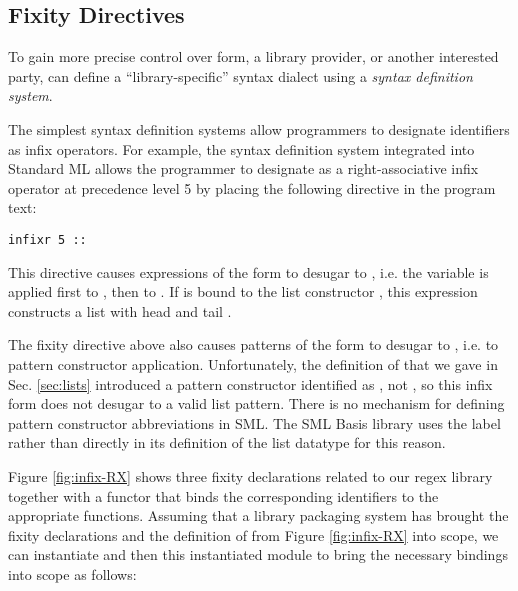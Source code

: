 \subsection{Fixity Directives}
To gain more precise control over form, a library provider, or another interested party, can define a ``library-specific'' syntax dialect using a \emph{syntax definition system}. 

The simplest syntax definition systems allow programmers to designate identifiers as infix operators. For example, the syntax definition system integrated into Standard ML allows the programmer to designate \li{::} as a right-associative infix operator at precedence level 5 by placing the following directive in the program text:
\begin{lstlisting}[numbers=none]
infixr 5 ::
\end{lstlisting}
This directive causes expressions of the form  to desugar to , i.e. the variable  is applied first to , then to . If  is bound to the list constructor , this expression constructs a list with head  and tail .

The fixity directive above also causes patterns of the form  to desugar to , i.e. to pattern constructor application. Unfortunately, the definition of  that we gave in Sec. \ref{sec:lists} introduced a pattern constructor identified as , not , so this infix form does not desugar to a valid list pattern. There is no mechanism for defining pattern constructor abbreviations in SML. The SML Basis library uses the label  rather than  directly in its definition of the list datatype for this reason.

Figure \ref{fig:infix-RX} shows three fixity declarations related to our regex library together with a functor  that binds the corresponding identifiers to the appropriate functions. Assuming that a library packaging system has brought the fixity declarations and the definition of  from Figure \ref{fig:infix-RX} into scope, we can instantiate  and then  this instantiated module to bring the necessary bindings into scope as follows:


